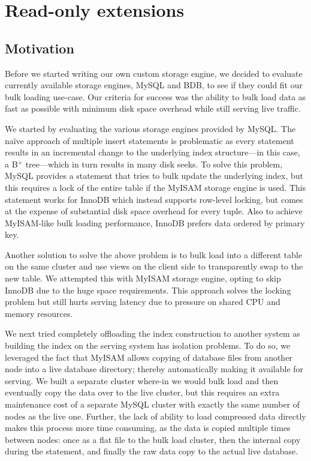 
\section{Read-only extensions}
\label{sec:read_only}

\subsection{Motivation}
Before we started writing our own custom storage engine, we decided to
evaluate currently available storage engines, MySQL and BDB, to see if
they could fit our bulk loading use-case. Our criteria for success was
the ability to bulk load data as fast as possible with minimum disk
space overhead while still serving live traffic.
 
We started by evaluating the various storage engines provided by
MySQL. The na\"ive approach of multiple insert statements is
problematic as every statement results in an incremental change to the
underlying index structure---in this case, a B$^{+}$ tree---which in
turn results in many disk seeks. To solve this problem, MySQL provides
a  statement that tries to bulk update the underlying
index, but this requires a lock of the entire table if the MyISAM
storage engine is used. This statement works for InnoDB which instead
supports row-level locking, but comes at the expense of substantial 
disk space overhead for every tuple. Also to achieve MyISAM-like bulk 
loading performance, InnoDB prefers data ordered by primary key.

Another solution to solve the above problem is to bulk load into a 
different table on the same cluster and use views on the client side to 
transparently swap to the new table. We attempted this with MyISAM 
storage engine, opting to skip InnoDB due to the huge space requirements.
This approach solves the locking problem but still hurts serving 
latency due to pressure on shared CPU and memory resources.  

We next tried completely offloading the index construction to another
system as building the index on the serving system has isolation
problems. To do so, we leveraged the fact that MyISAM allows copying
of database files from another node into a live database directory;
thereby automatically making it available for serving. We built a
separate cluster where-in we would bulk load and then eventually copy
the data over to the live cluster, but this requires an extra
maintenance cost of a separate MySQL cluster with exactly the same
number of nodes as the live one. Further, the lack of ability to load
compressed data directly makes this process more time consuming, as
the data is copied multiple times between nodes: once as a flat file
to the bulk load cluster, then the internal copy during the 
statement, and finally the raw data copy to the actual live database. 

